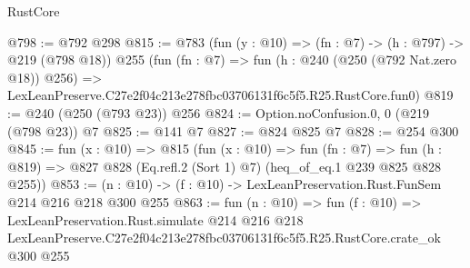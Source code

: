 \begin{lexlean}{RustCore}
\begin{coremodule}
@798 := @792 @298
@815 := @783
    (fun (y : @10) => (fn : @7) -> (h : @797) -> @219 (@798 @18))
    @255
    (fun (fn : @7) =>
    fun (h : @240 (@250 (@792 Nat.zero @18)) @256) =>
    LexLeanPreserve.C27e2f04c213e278fbc03706131f6c5f5.R25.RustCore.fun0)
@819 := @240 (@250 (@793 @23)) @256
@824 := Option.noConfusion.{0, 0} (@219 (@798 @23)) @7
@825 := @141 @7
@827 := @824 @825 @7
@828 := @254 @300
@845 := fun (x : @10) =>
  @815
    (fun (x : @10) =>
    fun (fn : @7) =>
    fun (h : @819) => @827 @828 (Eq.refl.{2} (Sort 1) @7) (heq_of_eq.{1} @239 @825 @828 @255))
@853 := (n : @10) -> (f : @10) -> LexLeanPreservation.Rust.FunSem @214 @216 @218 @300 @255
@863 := fun (n : @10) =>
  fun (f : @10) =>
  LexLeanPreservation.Rust.simulate
    @214
    @216
    @218
    LexLeanPreserve.C27e2f04c213e278fbc03706131f6c5f5.R25.RustCore.crate_ok
    @300
    @255
\end{coremodule}
\end{lexlean}
